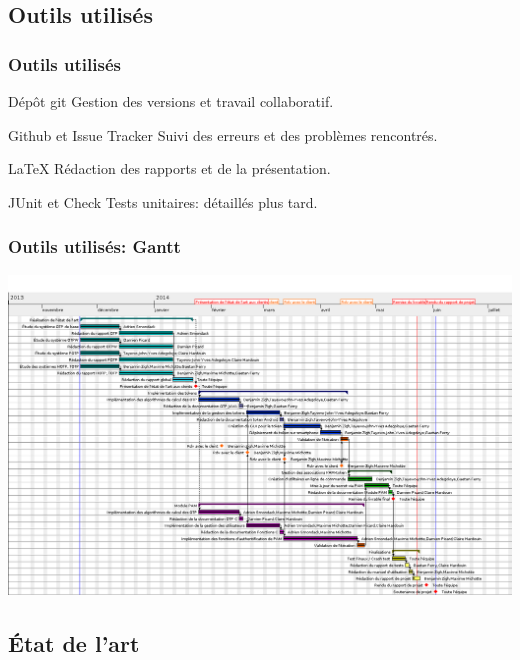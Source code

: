 \documentclass[xcolor=table]{beamer}
\begin{document}
\subsection{Outils utilisés}
\begin{frame}
\frametitle{Outils utilisés}

\begin{block}{Dépôt git}
Gestion des versions et travail collaboratif.
\end{block}

\begin{block}{Github et Issue Tracker}
Suivi des erreurs et des problèmes rencontrés.
\end{block}

\begin{block}{LaTeX}
Rédaction des rapports et de la présentation.
\end{block}

\begin{block}{JUnit et Check}
Tests unitaires: détaillés plus tard.
\end{block}

\end{frame}

\begin{frame}
\frametitle{Outils utilisés: Gantt}

\includegraphics[scale=0.25]{../graphics/gantt2-0.png}
\end{frame}

\subsection{État de l'art}
\end{document}
